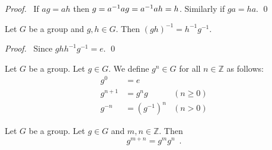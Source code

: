 \begin{proof}
    \pf\ If $ag = ah$ then $g = {a}^{-1} a g = {a}^{-1} a h = h$. Similarly if $ga = ha$. \qed
\end{proof}

\begin{prop}
    Let $G$ be a group and $g,h \in G$. Then $(gh)^{-1} = h^{-1}g^{-1}$.
\end{prop}

\begin{proof}
    \pf\ Since $ghh^{-1}g^{-1} = e$. \qed
\end{proof}

\begin{df}
\label{df:power-in-group}
    Let $G$ be a group. Let $g \in G$. We define $g^n \in G$ for all $n \in \mathbb{Z}$ as follows:
    \begin{align*}
        g^0     & = e                       \\
        g^{n+1} & = g^n g      & (n \geq 0) \\
        g^{-n}  & = (g^{-1})^n & (n > 0)
    \end{align*}
\end{df}

\begin{prop}
    \label{prop:power-add}
    Let $G$ be a group. Let $g \in G$ and $m,n \in \mathbb{Z}$. Then
    \[ g^{m+n} = g^m g^n \enspace . \]
\end{prop}

